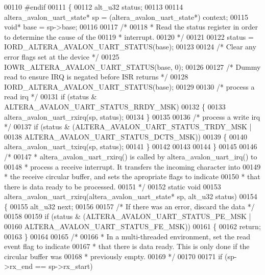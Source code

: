 \begin{DoxyCode}
00110 \textcolor{preprocessor}{#endif}
00111 \{
00112   alt_u32 status;
00113 
00114   altera_avalon_uart_state* sp = (altera_avalon_uart_state*) context;
00115   \textcolor{keywordtype}{void}* base               = sp->base;
00116 
00117   \textcolor{comment}{/*}
00118 \textcolor{comment}{   * Read the status register in order to determine the cause of the}
00119 \textcolor{comment}{   * interrupt.}
00120 \textcolor{comment}{   */}
00121 
00122   status = IORD_ALTERA_AVALON_UART_STATUS(base);
00123 
00124   \textcolor{comment}{/* Clear any error flags set at the device */}
00125   IOWR_ALTERA_AVALON_UART_STATUS(base, 0);
00126 
00127   \textcolor{comment}{/* Dummy read to ensure IRQ is negated before ISR returns */}
00128   IORD_ALTERA_AVALON_UART_STATUS(base);
00129   
00130   \textcolor{comment}{/* process a read irq */}
00131   \textcolor{keywordflow}{if} (status & ALTERA_AVALON_UART_STATUS_RRDY_MSK)
00132   \{
00133     altera_avalon_uart_rxirq(sp, status);
00134   \}
00135 
00136   \textcolor{comment}{/* process a write irq */}
00137   \textcolor{keywordflow}{if} (status & (ALTERA_AVALON_UART_STATUS_TRDY_MSK | 
00138                   ALTERA_AVALON_UART_STATUS_DCTS_MSK))
00139   \{
00140     altera_avalon_uart_txirq(sp, status);
00141   \}
00142   
00143 
00144 \}
00145 
00146 \textcolor{comment}{/*}
00147 \textcolor{comment}{ * altera\_avalon\_uart\_rxirq() is called by altera\_avalon\_uart\_irq() to }
00148 \textcolor{comment}{ * process a receive interrupt. It transfers the incoming character into }
00149 \textcolor{comment}{ * the receive circular buffer, and sets the apropriate flags to indicate }
00150 \textcolor{comment}{ * that there is data ready to be processed.}
00151 \textcolor{comment}{ */}
00152 \textcolor{keyword}{static} \textcolor{keywordtype}{void} 
00153 altera_avalon_uart_rxirq(altera_avalon_uart_state* sp, alt_u32 status)
00154 \{
00155   alt_u32 next;
00156   
00157   \textcolor{comment}{/* If there was an error, discard the data */}
00158 
00159   \textcolor{keywordflow}{if} (status & (ALTERA_AVALON_UART_STATUS_PE_MSK | 
00160                   ALTERA_AVALON_UART_STATUS_FE_MSK))
00161   \{
00162     \textcolor{keywordflow}{return};
00163   \}
00164 
00165   \textcolor{comment}{/*}
00166 \textcolor{comment}{   * In a multi-threaded environment, set the read event flag to indicate}
00167 \textcolor{comment}{   * that there is data ready. This is only done if the circular buffer was}
00168 \textcolor{comment}{   * previously empty.}
00169 \textcolor{comment}{   */}
00170 
00171   \textcolor{keywordflow}{if} (sp->rx_end == sp->rx_start)

\end{DoxyCode}
